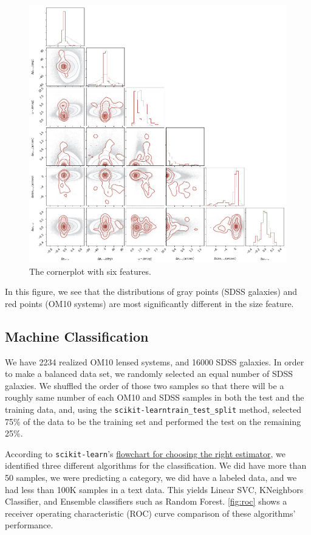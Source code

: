 \documentclass[\docopts]{\docclass}
\def\sklearn{\texttt{scikit-learn}\xspace}
\begin{document}
\begin{figure}
\includegraphics[width=0.9\columnwidth]{cornerplot.png}
\caption{The cornerplot with six features.}
 \label{fig:cornerplot}
\end{figure}

In this figure, we see that the distributions of gray points (SDSS
galaxies) and  red points (OM10 systems) are most significantly
different in the size feature.


\subsection{Machine Classification}
\label{subsec:classification}

We have 2234 realized OM10 lensed systems,
and 16000 SDSS galaxies. In order to make a balanced data set, we
randomly selected an equal number of SDSS galaxies. We shuffled the
order of those two samples so that there will be a roughly same number
of each OM10 and SDSS samples in both the test and the training data,
and, using the \sklearn \texttt{train\_test\_split} method, selected
75\% of the data to be the training set and performed the test on the
remaining 25\%.

According to \sklearn's
\href{http://scikit-learn.org/stable/tutorial/machine_learning_map/index.html}
{flowchart for choosing the right estimator}, we identified three
different algorithms for the classification. We did have more than 50
samples, we were predicting a category, we did have a labeled data, and
we had less than 100K samples in a text data. This yields Linear SVC,
KNeighbors Classifier, and Ensemble classifiers such as Random Forest.
\autoref{fig:roc} shows a receiver operating characteristic (ROC) curve
comparison of these algorithms' performance.
\end{document}
